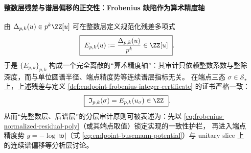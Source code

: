 \paragraph{整数层残差与谱层偏移的正交性：Frobenius 缺陷作为算术精度轴}
由 \(\Delta_{p,k}(u)\in p^k\ZZ[u]\) 可在整数层定义规范化残差多项式
\begin{equation}\label{eq:frobenius-normalized-residual-poly}
\boxed{\ E_{p,k}(u):=\frac{\Delta_{p,k}(u)}{p^{k}}\in\ZZ[u]\ }.
\end{equation}
于是 \(\{E_{p,k}\}_{p,k}\) 构成一个完全离散的“算术精度轴”：其审计只依赖整数系数与整除深度，而与单位圆谱半径、端点精度势等连续谱层指标无关。
在端点三态 \(\sigma\in\mathcal S_{\star}\) 上，上述残差与定义 \ref{def:endpoint-frobenius-integer-certificate} 的证书严格一致：
\[
\boxed{\ \mathfrak I_{p,k}(\sigma)=E_{p,k}(u_\sigma)\in\ZZ\ }.
\]
从而“先整数层、后谱层”的分层审计原则可被表述为：先以 \eqref{eq:frobenius-normalized-residual-poly}（或其端点取值）锁定实现的一致性护栏，
再进入端点精度势 \(y=-\log|\mathfrak{w}|\)（式 \eqref{eq:endpoint-busemann-potential}）与 unitary slice 上的连续谱偏移等分析层讨论。

